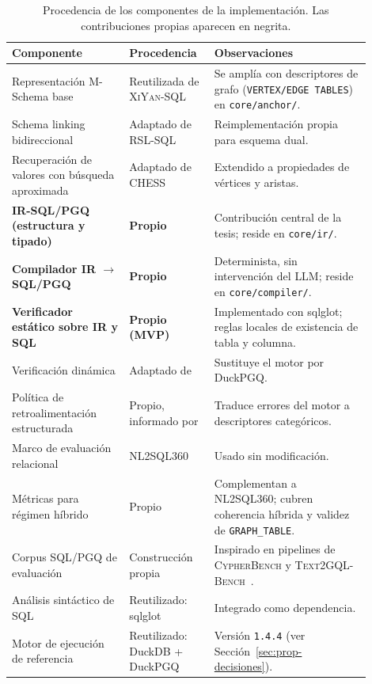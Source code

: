 \begin{table}[htb]
    \centering
    \footnotesize
    \begin{tabular}{p{0.30\linewidth} p{0.20\linewidth} p{0.40\linewidth}}
        \toprule
        \textbf{Componente} & \textbf{Procedencia} & \textbf{Observaciones} \\
        \midrule
        Representación M-Schema base & Reutilizada de \textsc{XiYan-SQL}~\cite{XiYan-SQL2024} & Se amplía con descriptores de grafo (\texttt{VERTEX/EDGE TABLES}) en \texttt{core/anchor/}. \\
        Schema linking bidireccional & Adaptado de \textsc{RSL-SQL}~\cite{RSL-SQL2024} & Reimplementación propia para esquema dual. \\
        Recuperación de valores con búsqueda aproximada & Adaptado de \textsc{CHESS}~\cite{CHESS2024} & Extendido a propiedades de vértices y aristas. \\
        \textbf{IR-SQL/PGQ (estructura y tipado)} & \textbf{Propio} & Contribución central de la tesis; reside en \texttt{core/ir/}. \\
        \textbf{Compilador IR $\to$ \ac{SQL}/\ac{PGQ}} & \textbf{Propio} & Determinista, sin intervención del \ac{LLM}; reside en \texttt{core/compiler/}. \\
        \textbf{Verificador estático sobre IR y SQL} & \textbf{Propio (MVP)} & Implementado con sqlglot; reglas locales de existencia de tabla y columna. \\
        Verificación dinámica & Adaptado de \cite{CHESS2024, TS-SQL2025} & Sustituye el motor por DuckPGQ. \\
        Política de retroalimentación estructurada & Propio, informado por \cite{errorllm2026} & Traduce errores del motor a descriptores categóricos. \\
        Marco de evaluación relacional & \textsc{NL2SQL360}~\cite{SuperSQL2024} & Usado sin modificación. \\
        Métricas para régimen híbrido & Propio & Complementan a NL2SQL360; cubren coherencia híbrida y validez de \texttt{GRAPH\_TABLE}. \\
        Corpus \ac{SQL}/\ac{PGQ} de evaluación & Construcción propia & Inspirado en pipelines de \textsc{CypherBench} y \textsc{Text2GQL-Bench}~\cite{text2gqlbench}. \\
        Análisis sintáctico de SQL & Reutilizado: sqlglot & Integrado como dependencia. \\
        Motor de ejecución de referencia & Reutilizado: DuckDB + DuckPGQ~\cite{DuckPGQ} & Versión \texttt{1.4.4} (ver Sección~\ref{sec:prop-decisiones}). \\
        \bottomrule
    \end{tabular}
    \caption{Procedencia de los componentes de la implementación. Las contribuciones propias aparecen en negrita.}
    \label{tab:componentes-prop}
\end{table}

